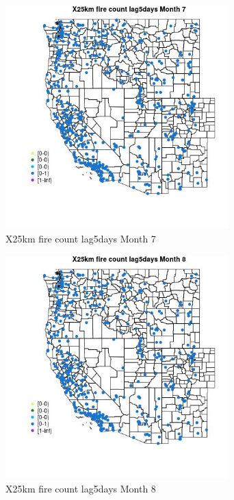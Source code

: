 \begin{figure} 
\centering  
\includegraphics[width=0.77\textwidth]{Code_Outputs/Report_ML_input_PM25_Step4_part_e_de_duplicated_aves_compiled_2019-05-14wNAs_MapObsMo7X25km_fire_count_lag5days.jpg} 
\caption{\label{fig:Report_ML_input_PM25_Step4_part_e_de_duplicated_aves_compiled_2019-05-14wNAsMapObsMo7X25km_fire_count_lag5days}X25km fire count lag5days Month 7} 
\end{figure} 
 

\begin{figure} 
\centering  
\includegraphics[width=0.77\textwidth]{Code_Outputs/Report_ML_input_PM25_Step4_part_e_de_duplicated_aves_compiled_2019-05-14wNAs_MapObsMo8X25km_fire_count_lag5days.jpg} 
\caption{\label{fig:Report_ML_input_PM25_Step4_part_e_de_duplicated_aves_compiled_2019-05-14wNAsMapObsMo8X25km_fire_count_lag5days}X25km fire count lag5days Month 8} 
\end{figure} 
 

